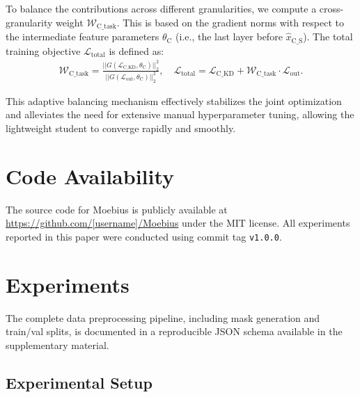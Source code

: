 \documentclass{llmxive}
\begin{document}
To balance the contributions across different granularities, we compute a cross-granularity weight $\mathcal{W}_{\text{C\_task}}$. This is based on the gradient norms with respect to the intermediate feature parameters $\theta_\text{C}$ (i.e., the last layer before $\hat{x}_{\text{C\_S}}$). The total training objective $\mathcal{L}_{\text{total}}$ is defined as: 
\begin{equation}
\begin{gathered}
    \mathcal{W}_{\text{C\_task}} = \frac{||G(\mathcal{L}_{\text{C\_KD}}, \theta_\text{C})||^2_2}{||G(\mathcal{L}_{\text{out}}, \theta_\text{C})||^2_2}, \quad
    \mathcal{L}_{\text{total}} = \mathcal{L}_{\text{C\_KD}} + \mathcal{W}_{\text{C\_task}} \cdot \mathcal{L}_{\text{out}}.
\end{gathered}
\end{equation}

This adaptive balancing mechanism effectively stabilizes the joint optimization and alleviates the need for extensive manual hyperparameter tuning, allowing the lightweight student to converge rapidly and smoothly.


\vspace{-0.5em}
\section{Code Availability}
The source code for Moebius is publicly available at \url{https://github.com/[username]/Moebius} under the MIT license. All experiments reported in this paper were conducted using commit tag \texttt{v1.0.0}.

\section{Experiments}

The complete data preprocessing pipeline, including mask generation and train/val splits, is documented in a reproducible JSON schema available in the supplementary material.\label{sec:experiments}
\vspace{-0.5em}

\subsection{Experimental Setup}\label{subsec:setup}

\vspace{-0.4em}
\end{document}

